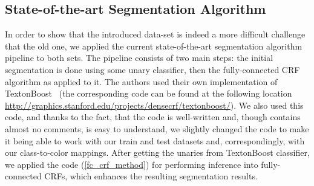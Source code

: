 \subsection{State-of-the-art Segmentation Algorithm}
\label{sec:sota_new_set}
In order to show that the introduced data-set is indeed a more difficult challenge that the old one, we applied the current state-of-the-art
segmentation algorithm~\cite{Krahenbuhl2011} pipeline to both sets. The pipeline consists of two main steps: the initial segmentation is done using some
unary classifier, then the fully-connected CRF algorithm as applied to it. The authors used their own implementation of TextonBoost~\cite{Shotton2009}
(the corresponding code can be found at the following location \url{http://graphics.stanford.edu/projects/densecrf/textonboost/}). We also used this code,
and thanks to the fact, that the code is well-written and, though contains almost no comments, is easy to understand, we slightly changed the 
code to make it being able to work with our train and test datasets and, correspondingly, with our class-to-color mappings. After getting the unaries
from TextonBoost classifier, we applied the code (\ref{fc_crf_method}) for performing inference into fully-connected CRFs, which enhances 
the resulting segmentation results.

